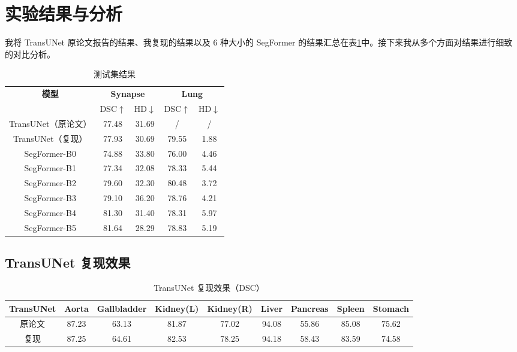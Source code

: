\documentclass[hyperref,a4paper,UTF8]{ctexart}
\begin{document}
\section{实验结果与分析\label{sec:实验结果与分析}}

我将 TransUNet 原论文报告的结果、我复现的结果以及 6 种大小的 SegFormer 的结果汇总在表\ref{tab:测试集结果}中。接下来我从多个方面对结果进行细致的对比分析。

\begin{table}[ht!]
    \centering
    \caption{测试集结果}
    \label{tab:测试集结果}
    \begin{tabular}{c|c|c|c|c}
        \multirow{2}{*}{\textbf{模型}} & \multicolumn{2}{c|}{\textbf{Synapse}} & \multicolumn{2}{c}{\textbf{Lung}}\\
            & DSC$\uparrow$ & HD$\downarrow$ & DSC$\uparrow$ & HD$\downarrow$\\
        \hline
        TransUNet（原论文） & 77.48 & 31.69 & / & / \\
        TransUNet（复现） & 77.93 & 30.69 & 79.55 & 1.88 \\
        \hline
        SegFormer-B0 & 74.88 & 33.80 & 76.00 & 4.46 \\
        SegFormer-B1 & 77.34 & 32.08 & 78.33 & 5.44 \\
        SegFormer-B2 & 79.60 & 32.30 & 80.48 & 3.72 \\
        SegFormer-B3 & 79.10 & 36.20 & 78.76 & 4.21 \\
        SegFormer-B4 & 81.30 & 31.40 & 78.31 & 5.97 \\
        SegFormer-B5 & 81.64 & 28.29 & 78.83 & 5.19
    \end{tabular}
\end{table}

\subsection{TransUNet 复现效果}

\begin{table}[ht!]
    \centering
    \caption{TransUNet 复现效果（DSC）}
    \label{tab:TransUNet复现效果}
    \begin{tabular}{c|c|c|c|c|c|c|c|c}
        \textbf\small{TransUNet} & \textbf\small{Aorta} & \textbf\small{Gallbladder} & \textbf\small{Kidney(L)} & \textbf\small{Kidney(R)} & \textbf\small{Liver} & \textbf\small{Pancreas} & \textbf\small{Spleen} & \textbf\small{Stomach}\\
        \hline
        原论文 & 87.23 & 63.13 & 81.87 & 77.02 & 94.08 & 55.86 & 85.08 & 75.62 \\
        复现 & 87.25 & 64.61 & 82.53 & 78.25 & 94.18 & 58.43 & 83.59 & 74.58
    \end{tabular}
\end{table}
\end{document}
